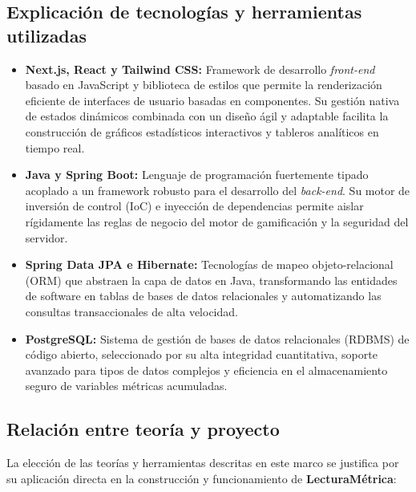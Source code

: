 \documentclass[12pt, atypical, journal]{article}
\begin{document}
\subsection{Explicación de tecnologías y herramientas utilizadas}
\begin{itemize}
   \item \textbf{Next.js, React y Tailwind CSS:} Framework de desarrollo \textit{front-end} basado en JavaScript y biblioteca de estilos que permite la renderización eficiente de interfaces de usuario basadas en componentes. Su gestión nativa de estados dinámicos combinada con un diseño ágil y adaptable facilita la construcción de gráficos estadísticos interactivos y tableros analíticos en tiempo real.
   \item \textbf{Java y Spring Boot:} Lenguaje de programación fuertemente tipado acoplado a un framework robusto para el desarrollo del \textit{back-end}. Su motor de inversión de control (IoC) e inyección de dependencias permite aislar rígidamente las reglas de negocio del motor de gamificación y la seguridad del servidor.
   \item \textbf{Spring Data JPA e Hibernate:} Tecnologías de mapeo objeto-relacional (ORM) que abstraen la capa de datos en Java, transformando las entidades de software en tablas de bases de datos relacionales y automatizando las consultas transaccionales de alta velocidad.
   \item \textbf{PostgreSQL:} Sistema de gestión de bases de datos relacionales (RDBMS) de código abierto, seleccionado por su alta integridad cuantitativa, soporte avanzado para tipos de datos complejos y eficiencia en el almacenamiento seguro de variables métricas acumuladas.
\end{itemize}

\subsection{Relación entre teoría y proyecto}
La elección de las teorías y herramientas descritas en este marco se justifica por su aplicación directa en la construcción y funcionamiento de \textbf{LecturaMétrica}:
\end{document}
